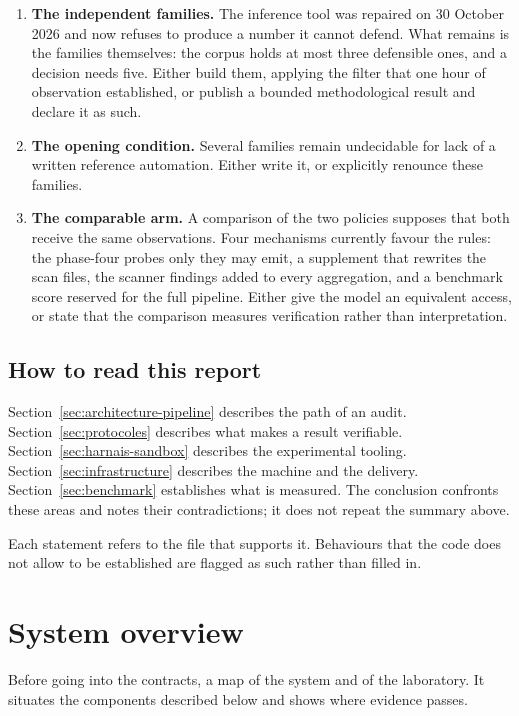 \begin{enumerate}
\item \textbf{The independent families.} The inference tool was repaired on
30 October 2026 and now refuses to produce a number it cannot defend. What
remains is the families themselves: the corpus holds at most three defensible
ones, and a decision needs five. Either build them, applying the filter that one
hour of observation established, or publish a bounded methodological result and
declare it as such.
\item \textbf{The opening condition.} Several families remain undecidable for lack
of a written reference automation. Either write it, or explicitly renounce these
families.

\item \textbf{The comparable arm.} A comparison of the two policies supposes that
both receive the same observations. Four mechanisms currently favour the rules:
the phase-four probes only they may emit, a supplement that rewrites the scan
files, the scanner findings added to every aggregation, and a benchmark score
reserved for the full pipeline. Either give the model an equivalent access, or
state that the comparison measures verification rather than interpretation.
\end{enumerate}

\subsection{How to read this report}

Section~\ref{sec:architecture-pipeline} describes the path of an audit.
Section~\ref{sec:protocoles} describes what makes a result verifiable.
Section~\ref{sec:harnais-sandbox} describes the experimental tooling.
Section~\ref{sec:infrastructure} describes the machine and the delivery.
Section~\ref{sec:benchmark} establishes what is measured.
The conclusion confronts these areas and notes their contradictions; it does not
repeat the summary above.

Each statement refers to the file that supports it. Behaviours that the code does
not allow to be established are flagged as such rather than filled in.

\clearpage
\section{System overview}
\label{sec:vue-ensemble}

Before going into the contracts, a map of the system and of the laboratory. It
situates the components described below and shows where evidence passes.

